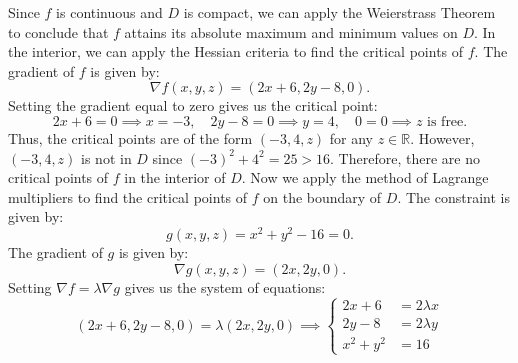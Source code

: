 \documentclass[11pt]{article}
\begin{document}
Since \(f\) is continuous and \(D\) is compact, we can apply the Weierstrass Theorem to conclude that \(f\) attains its absolute maximum and minimum values on \(D\). In the interior, we can apply the Hessian criteria to find the critical points of \(f\). The gradient of \(f\) is given by:
\[\nabla f(x, y, z) = (2x + 6, 2y - 8, 0).\]
Setting the gradient equal to zero gives us the critical point:
\[2x + 6 = 0 \implies x = -3, \quad 2y - 8 = 0 \implies y = 4, \quad 0 = 0 \implies z \text{ is free}.\]
Thus, the critical points are of the form \((-3, 4, z)\) for any \(z \in \mathbb{R}\). However, \((-3, 4, z)\) is not in \(D\) since \((-3)^2 + 4^2 = 25 > 16\). Therefore, there are no critical points of \(f\) in the interior of \(D\). Now we apply the method of Lagrange multipliers to find the critical points of \(f\) on the boundary of \(D\). The constraint is given by:
\[g(x, y, z) = x^2 + y^2 - 16 = 0.\]
The gradient of \(g\) is given by:
\[\nabla g(x, y, z) = (2x, 2y, 0).\]
Setting \(\nabla f = \lambda \nabla g\) gives us the system of equations:
\[(2x + 6, 2y - 8, 0) = \lambda (2x, 2y, 0) \implies
\begin{cases}
2x + 6 & = 2\lambda x \\
2y - 8 & = 2\lambda y \\
x^2 + y^2 & = 16
\end{cases}\]
\end{document}
